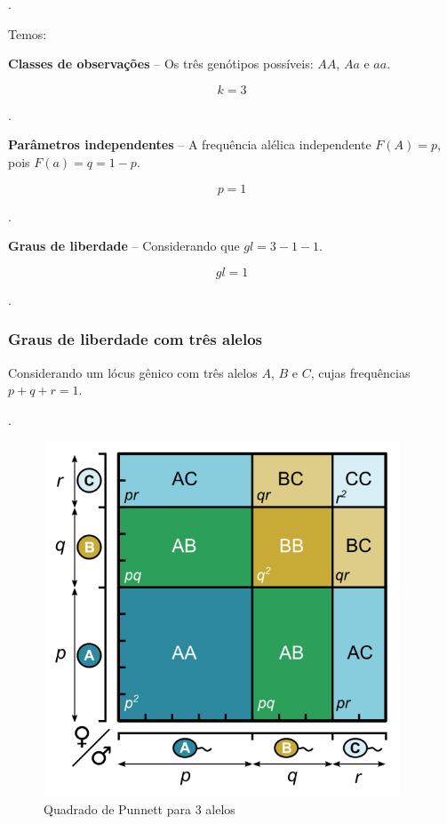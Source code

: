 \documentclass[
]{book}
\begin{document}
.\linebreak

Temos:

\textbf{Classes de observações} -- Os três genótipos possíveis: \(AA\), \(Aa\) e \(aa\).

\[k=3\]

.\linebreak

\textbf{Parâmetros independentes} -- A frequência alélica independente \(F(A)=p\), pois \(F(a)=q=1-p\).

\[p=1\]

.\linebreak

\textbf{Graus de liberdade} -- Considerando que \(gl=3-1-1\).

\[gl=1\]

.\linebreak

\hypertarget{graus-de-liberdade-com-truxeas-alelos}{%
\subsubsection{Graus de liberdade com três alelos}\label{graus-de-liberdade-com-truxeas-alelos}}

Considerando um lócus gênico com três alelos \(A\), \(B\) e \(C\), cujas frequências \(p+q+r=1\).

.\linebreak

\begin{figure}

{\centering \includegraphics[width=400px]{figs/punnett_3alelles} 

}

\caption{Quadrado de Punnett para 3 alelos}\label{fig:gl3alelos}
\end{figure}
\end{document}

